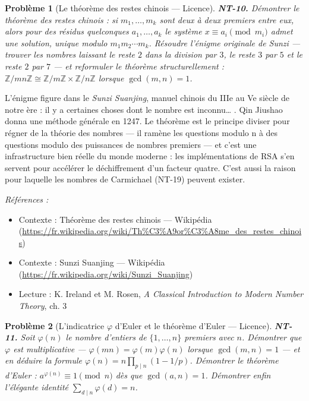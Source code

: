 \documentclass[11pt]{article}
\newtheorem{problem}{Problème}
\newenvironment{refs}{\par\small\noindent\emph{Références :}\begin{itemize}\setlength\itemsep{0pt}}{\end{itemize}\normalsize}
\begin{document}
\bigskip

\begin{problem}[{Le théorème des restes chinois --- Licence}]
\textbf{NT-10.} Démontrer le théorème des restes chinois : si
$m_1, \ldots, m_k$ sont deux à deux premiers entre eux, alors pour des résidus quelconques
$a_1, \ldots, a_k$ le système $x \equiv a_i \pmod{m_i}$ admet une solution, unique modulo
$m_1 m_2 \cdots m_k$. Résoudre l'énigme originale de Sunzi --- trouver les nombres laissant le reste
$2$ dans la division par $3$, le reste $3$ par $5$ et le reste $2$ par $7$ --- et
reformuler le théorème structurellement :
$\mathbb{Z}/mn\mathbb{Z} \cong \mathbb{Z}/m\mathbb{Z} \times \mathbb{Z}/n\mathbb{Z}$
lorsque $\gcd(m, n) = 1$.
\end{problem}

\noindent L'énigme figure dans le \textit{Sunzi Suanjing}, manuel chinois du IIIe
au Ve siècle de notre ère : \og{} il y a certaines choses dont le nombre est inconnu\dots{} \fg{}. Qin
Jiushao donna une méthode générale en 1247. Le théorème est le principe \og{} diviser pour régner \fg{} de
la théorie des nombres --- il ramène les questions modulo n à des questions modulo des puissances de
nombres premiers --- et c'est une infrastructure bien réelle du monde moderne : les implémentations de
RSA s'en servent pour accélérer le déchiffrement d'un facteur quatre. C'est aussi la raison pour
laquelle les nombres de Carmichael (NT-19) peuvent exister.

\begin{refs}
\item Contexte : Théorème des restes chinois --- Wikipédia (\url{https://fr.wikipedia.org/wiki/Th%C3%A9or%C3%A8me_des_restes_chinois})
\item Contexte : Sunzi Suanjing --- Wikipédia (\url{https://fr.wikipedia.org/wiki/Sunzi_Suanjing})
\item Lecture : K. Ireland et M. Rosen, \textit{A Classical Introduction to Modern Number Theory}, ch. 3
\end{refs}

\bigskip

\begin{problem}[{L'indicatrice $\varphi$ d'Euler et le théorème d'Euler --- Licence}]
\textbf{NT-11.} Soit $\varphi(n)$ le nombre d'entiers de
$\{1, \ldots, n\}$ premiers avec $n$. Démontrer que $\varphi$ est multiplicative ---
$\varphi(mn) = \varphi(m)\varphi(n)$ lorsque $\gcd(m, n) = 1$ --- et en déduire la formule
$\varphi(n) = n \prod_{p \mid n} (1 - 1/p)$. Démontrer le théorème d'Euler :
$a^{\varphi(n)} \equiv 1 \pmod n$ dès que $\gcd(a, n) = 1$. Démontrer enfin l'élégante
identité $\sum_{d \mid n} \varphi(d) = n$.
\end{problem}
\end{document}
